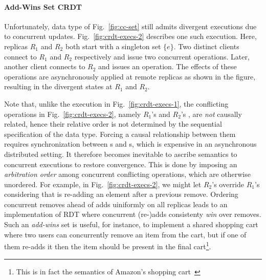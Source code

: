 \noindent\paragraph{Add-Wins Set CRDT} Unfortunately, 
data type of Fig.~\ref{fig:cc-set} still admits divergent executions
due to concurrent updates.  Fig.~\ref{fig:crdt-execs-2} describes one
such execution. Here, replicas $R_1$ and $R_2$ both start with a
singleton set $\{e\}$.  Two distinct clients connect to $R_1$ and
$R_2$ respectively and issue two concurrent 
operations. Later, another client connects to $R_2$ and issues an
 operation. The effects of these operations are
asynchronously applied at remote replicas as shown in the figure,
resulting in the divergent states at $R_1$ and $R_2$.

Note that, unlike the execution in Fig.~\ref{fig:crdt-execs-1}, the
conflicting operations in Fig.~\ref{fig:crdt-execs-2}, namely $R_1$'s
 and $R_2$'s , are \emph{not} causally related,
hence their relative order is not determined by the sequential
specification of the data type. Forcing a causal relationship between
them requires synchronization between s and s,
which is expensive in an asynchronous distributed setting. It
therefore becomes inevitable to ascribe semantics to concurrent
executions to restore convergence. This is done by imposing an
\emph{arbitration order} among concurrent conflicting operations,
which are otherwise unordered. For example, in
Fig.~\ref{fig:crdt-execs-2}, we might let $R_2$'s  override
$R_1$'s  considering that  is re-adding an
element after a previous remove. Ordering concurrent removes ahead
of adds uiniformly on all replicas leads to an implementation of
 RDT where concurrent (re-)adds consistenty \emph{win}
over removes. Such an \emph{add-wins} set is useful, for instance, to
implement a shared shopping cart where two users can concurrently
remove an item from the cart, but if one of them re-adds it then the
item should be present in the final cart\footnote{This is in fact the
semantics of Amazon's shopping cart~\cite{dynamo}}.

